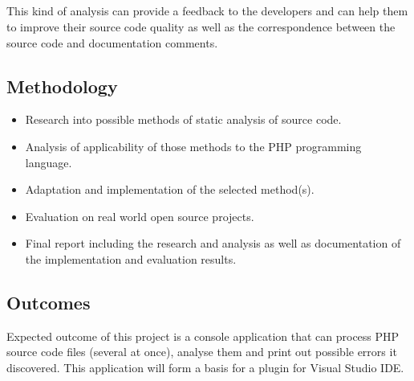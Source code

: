 \documentclass[a4paper,twoside]{article}
\begin{document}
  \subparagraph*{}
  This kind of analysis can provide a feedback to the developers and can help 
  them to improve their source code quality as well as the correspondence between 
  the source code and documentation comments.
  
  \subsection*{Methodology}
  \begin{itemize}
    \item{} Research into possible methods of static analysis of source code.
    \item{} Analysis of applicability of those methods to the PHP programming language.
    \item{} Adaptation and implementation of the selected method(s).
    \item{} Evaluation on real world open source projects.
    \item{} Final report including the research and analysis as well as 
        documentation of the implementation and evaluation results.
  \end{itemize}
  
  \subsection*{Outcomes}
  Expected outcome of this project is a console application that can process PHP 
  source code files (several at once), analyse them and print out possible 
  errors it discovered. This application will form a basis 
  for a plugin for Visual Studio IDE.
  

  
  
\end{document}

